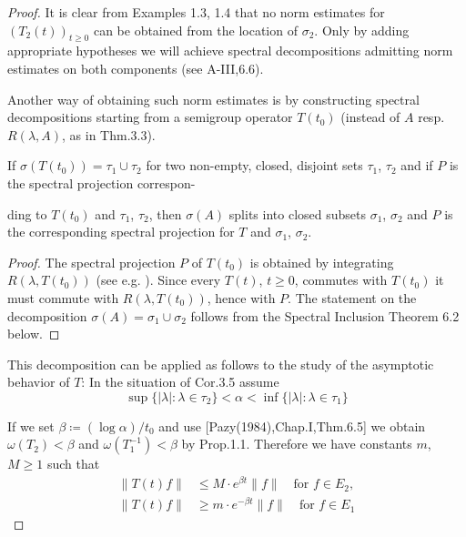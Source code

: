 \begin{proof}
It is clear from Examples 1.3, 1.4 that no norm estimates for $(T_{2}(t))_{t \geq 0}$ can be obtained from the location of $\sigma_{2}$.
Only by adding appropriate hypotheses we will achieve spectral decompositions admitting norm estimates on both components (see A-III,6.6).

Another way of obtaining such norm estimates is by constructing spectral decompositions starting from a semigroup operator $T(t_{0})$ (instead of $A$ resp. $R(\lambda,A)$, as in Thm.3.3).

\begin{corollary}\label{cor:a3-3.5}

If $\sigma(T(t_{0})) = \tau_{1} \cup \tau_{2}$ for two non-empty, closed, disjoint sets $\tau_{1}$, $\tau_{2}$ and if $P$ is the spectral projection correspon-



\newpage
ding to $T(t_{0})$ and $\tau_{1}$, $\tau_{2}$, then $\sigma(A)$ splits into closed subsets $\sigma_{1}$, $\sigma_{2}$ and $P$ is the corresponding spectral projection for $T$ and $\sigma_{1}$, $\sigma_{2}$.
\end{corollary}

\begin{proof}
The spectral projection $P$ of $T(t_{0})$ is obtained by integrating $R(\lambda,T(t_{0}))$ (see e.g. \citet[Section VII.3]{dunfordschwartz:1958}).
Since every $T(t)$, $t \geq 0$, commutes with $T(t_{0})$ it must commute with $R(\lambda,T(t_{0}))$, hence with $P$.
The statement on the decomposition $\sigma(A) = \sigma_{1} \cup \sigma_{2}$ follows from the Spectral Inclusion Theorem 6.2 below.
\end{proof}

This decomposition can be applied as follows to the study of the asymptotic behavior of $T$: In the situation of Cor.3.5 assume
\[
\sup \{|\lambda| \colon \lambda \in \tau_{2}\} < \alpha < \inf \{|\lambda| \colon \lambda \in \tau_{1}\}
\]

If we set $\beta \coloneqq (\log\alpha)/t_{0}$ and use [Pazy(1984),Chap.I,Thm.6.5] we obtain $\omega(T_{2}) < \beta$ and $\omega(T_{1}^{-1}) < \beta$ by Prop.1.1.
Therefore we have constants $m$, $M \geq 1$ such that
\begin{align*}
\|T(t)f\| &\leq M \cdot e^{\beta t}\|f\| \quad \text{for } f \in E_{2}, \\
\|T(t)f\| &\geq m \cdot e^{-\beta t}\|f\| \quad \text{for } f \in E_{1}
\end{align*}


\end{proof}
